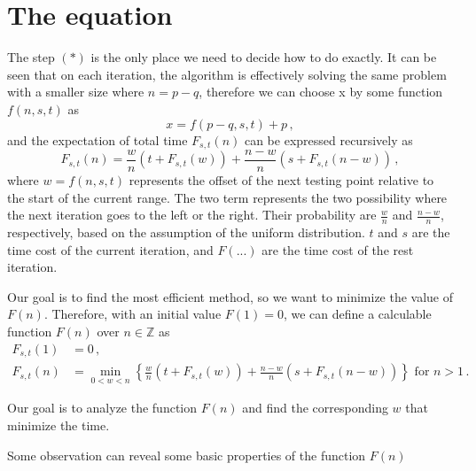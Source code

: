 \documentclass[]{article}
\begin{document}
\section{The equation}
 
The step $(*)$ is the only place we need to decide how to do exactly. It can be seen that on each iteration, the algorithm is effectively solving the same problem with a smaller size where $n = p - q$, therefore we can choose x by some function $f(n, s, t)$ as
\[
x = f(p - q, s, t) + p \,,
\]
and the expectation of total time $F_{s,t}(n)$ can be expressed recursively as
\begin{equation}
F_{s,t}(n) = \frac{w}{n}(t + F_{s,t}(w)) + \frac{n-w}{n}(s + F_{s,t}(n-w))\,,
\end{equation}
where $w = f(n, s, t)$ represents the offset of the next testing point relative to the start of the current range. The two term represents the two possibility where the next iteration goes to the left or the right. Their probability are $\frac{w}{n}$ and $\frac{n-w}{n}$, respectively, based on the assumption of the uniform distribution. $t$ and $s$ are the time cost of the current iteration, and $F(...)$ are the time cost of the rest iteration.

Our goal is to find the most efficient method, so we want to minimize the value of $F(n)$. Therefore, with an initial value $F(1) = 0$, we can define a calculable function $F(n)$ over $n \in \mathbb{Z}$ as
\begin{align*}
F_{s,t}(1) &= 0\,,\\
F_{s,t}(n) &= \min_{0<w<n}\left\{\frac{w}{n}(t + F_{s,t}(w)) + \frac{n-w}{n}(s + F_{s,t}(n-w))\right\} \textrm{ for } n > 1 \,.
\end{align*}

Our goal is to analyze the function $F(n)$ and find the corresponding $w$ that minimize the time.

Some observation can reveal some basic properties of the function $F(n)$
\end{document}
